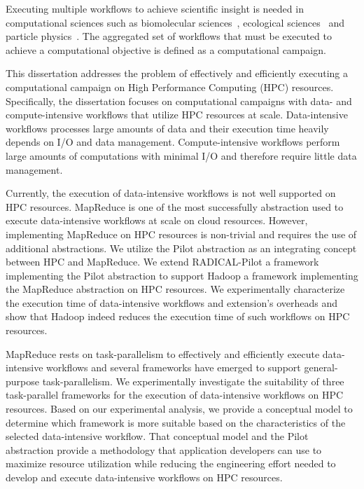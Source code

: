 Executing multiple workflows to achieve scientific insight is needed in
computational sciences such as biomolecular sciences~\cite{cheatham2015impact,
dakka2018concurrent}, ecological sciences~\cite{goncalves2020sealnet,
paraskevakos2019workflow} and particle physics~\cite{atlas}. The aggregated
set of workflows that must be executed to achieve a computational objective is
defined as a computational campaign.


This dissertation addresses the problem of effectively and efficiently executing
a computational campaign on High Performance Computing (HPC) resources.
Specifically, the dissertation focuses on computational campaigns with data- and
compute-intensive workflows that utilize HPC resources at scale. Data-intensive
workflows processes large amounts of data and their execution time heavily
depends on I/O and data management. Compute-intensive workflows perform large
amounts of computations with minimal I/O and therefore require little data
management.

Currently, the execution of data-intensive workflows is not well supported on
HPC resources. MapReduce is one of the most successfully abstraction used to
execute data-intensive workflows at scale on cloud resources. However,
implementing MapReduce on HPC resources is non-trivial and requires the use of
additional abstractions. We utilize the Pilot abstraction as an integrating
concept between HPC and MapReduce. We extend RADICAL-Pilot \textendash{} a
framework implementing the Pilot abstraction \textendash{} to support Hadoop
\textendash{} a framework implementing the MapReduce
abstraction \textendash{} on HPC resources. We experimentally characterize the
execution time of data-intensive workflows and extension's overheads and show
that Hadoop indeed reduces the execution time of such workflows on HPC
resources.


MapReduce rests on task-parallelism to effectively and efficiently execute
data-intensive workflows and several frameworks have emerged to support
general-purpose task-parallelism. We experimentally investigate the suitability
of three task-parallel frameworks for the execution of data-intensive workflows
on HPC resources. Based on our experimental analysis, we provide a conceptual
model to determine which framework is more suitable based on the characteristics of the
selected data-intensive workflow. That conceptual model and the Pilot
abstraction provide a methodology that application developers can use to
maximize resource utilization while reducing the engineering effort needed to
develop and execute data-intensive workflows on HPC resources.

